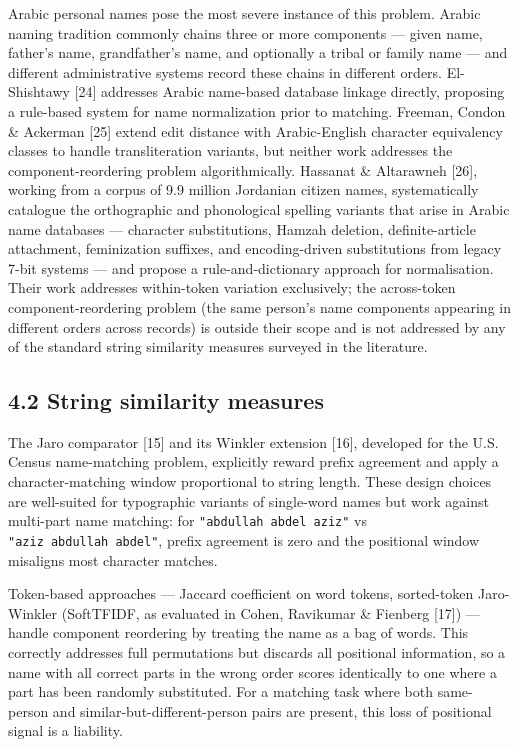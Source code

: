\documentclass[
  11pt,
]{article}
\begin{document}
Arabic personal names pose the most severe instance of this problem.
Arabic naming tradition commonly chains three or more components ---
given name, father's name, grandfather's name, and optionally a tribal
or family name --- and different administrative systems record these
chains in different orders. El-Shishtawy {[}24{]} addresses Arabic
name-based database linkage directly, proposing a rule-based system for
name normalization prior to matching. Freeman, Condon \& Ackerman
{[}25{]} extend edit distance with Arabic-English character equivalency
classes to handle transliteration variants, but neither work addresses
the component-reordering problem algorithmically. Hassanat \& Altarawneh
{[}26{]}, working from a corpus of 9.9 million Jordanian citizen names,
systematically catalogue the orthographic and phonological spelling
variants that arise in Arabic name databases --- character
substitutions, Hamzah deletion, definite-article attachment,
feminization suffixes, and encoding-driven substitutions from legacy
7-bit systems --- and propose a rule-and-dictionary approach for
normalisation. Their work addresses within-token variation exclusively;
the across-token component-reordering problem (the same person's name
components appearing in different orders across records) is outside
their scope and is not addressed by any of the standard string
similarity measures surveyed in the literature.

\subsection{4.2 String similarity
measures}\label{string-similarity-measures}

The Jaro comparator {[}15{]} and its Winkler extension {[}16{]},
developed for the U.S. Census name-matching problem, explicitly reward
prefix agreement and apply a character-matching window proportional to
string length. These design choices are well-suited for typographic
variants of single-word names but work against multi-part name matching:
for \texttt{"abdullah\ abdel\ aziz"} vs
\texttt{"aziz\ abdullah\ abdel"}, prefix agreement is zero and the
positional window misaligns most character matches.

Token-based approaches --- Jaccard coefficient on word tokens,
sorted-token Jaro-Winkler (SoftTFIDF, as evaluated in Cohen, Ravikumar
\& Fienberg {[}17{]}) --- handle component reordering by treating the
name as a bag of words. This correctly addresses full permutations but
discards all positional information, so a name with all correct parts in
the wrong order scores identically to one where a part has been randomly
substituted. For a matching task where both same-person and
similar-but-different-person pairs are present, this loss of positional
signal is a liability.
\end{document}

